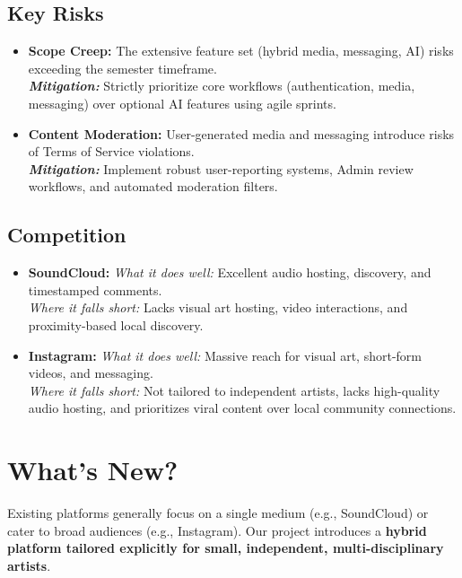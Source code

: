 \documentclass[11pt]{report}
\begin{document}
\section*{Key Risks}
\begin{itemize}
  \item \textbf{Scope Creep:} The extensive feature set (hybrid media, messaging, AI) risks exceeding the semester timeframe. \\
  \textbf{\textit{Mitigation:}} Strictly prioritize core workflows (authentication, media, messaging) over optional AI features using agile sprints.

  \item \textbf{Content Moderation:} User-generated media and messaging introduce risks of Terms of Service violations. \\
  \textbf{\textit{Mitigation:}} Implement robust user-reporting systems, Admin review workflows, and automated moderation filters.
\end{itemize}

\section*{Competition}
\begin{itemize}
  \item \textbf{SoundCloud:}
  \textit{What it does well:} Excellent audio hosting, discovery, and timestamped comments. \\
  \textit{Where it falls short:} Lacks visual art hosting, video interactions, and proximity-based local discovery.

  \item \textbf{Instagram:}
  \textit{What it does well:} Massive reach for visual art, short-form videos, and messaging. \\
  \textit{Where it falls short:} Not tailored to independent artists, lacks high-quality audio hosting, and prioritizes viral content over local community connections.
\end{itemize}

\chapter{What's New?}

Existing platforms generally focus on a single medium (e.g., SoundCloud) or cater to broad audiences (e.g., Instagram). Our project introduces a \textbf{hybrid platform tailored explicitly for small, independent, multi-disciplinary artists}.
\end{document}
